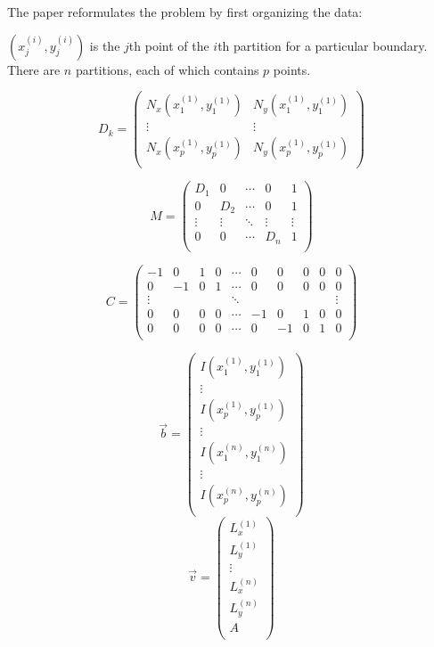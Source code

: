 \documentclass[10pt,twocolumn,letterpaper]{article}
\begin{document}
The paper reformulates the problem by first organizing the data:

$(x^{(i)}_j,y^{(i)}_j)$ is the $j$th point of the $i$th partition for a particular boundary. There are $n$ partitions, each of which contains $p$ points.

\[D_k = 
\begin{pmatrix}
N_x(x^{(1)}_1,y^{(1)}_1) & N_y(x^{(1)}_1,y^{(1)}_1) \\
	\vdots & \vdots\\
	N_x(x^{(1)}_p,y^{(1)}_p) & N_y(x^{(1)}_p,y^{(1)}_p) \\
	\end{pmatrix}\]

	
\[M = 
	\begin{pmatrix}
	D_1 & 0 &\cdots & 0 & 1\\
	0 & D_2 &\cdots & 0 & 1\\
 	\vdots & \vdots & \ddots & \vdots& \vdots\\
	0 & 0 & \cdots & D_n & 1\\
	\end{pmatrix}\]
	
	
\[C = 
	\begin{pmatrix}
	-1 & 0 & 1 & 0 & \cdots & 0 & 0 & 0 & 0 & 0\\
	0 & -1 & 0 & 1 & \cdots & 0 & 0 & 0 & 0 & 0\\
	\vdots & & & & \ddots & & & & & \vdots\\
	0 & 0 & 0 & 0 & \cdots & -1 & 0 & 1 & 0 & 0\\
	0 & 0 & 0 & 0 & \cdots & 0 & -1 & 0 & 1 & 0\\
	\end{pmatrix}\]
	
\[\vec{b} =
	\begin{pmatrix}
	I(x^{(1)}_1,y^{(1)}_1)\\
	\vdots\\
	I(x^{(1)}_p,y^{(1)}_p)\\
	\vdots\\
	I(x^{(n)}_1,y^{(n)}_1)\\
	\vdots\\
	I(x^{(n)}_p,y^{(n)}_p)\\
	\end{pmatrix}\]
\[\vec{v} = 
	\begin{pmatrix}
	L^{(1)}_x\\
	L^{(1)}_y\\
	\vdots\\
	L^{(n)}_x\\
	L^{(n)}_y\\
	A\\
	\end{pmatrix}\]
	
\end{document}
